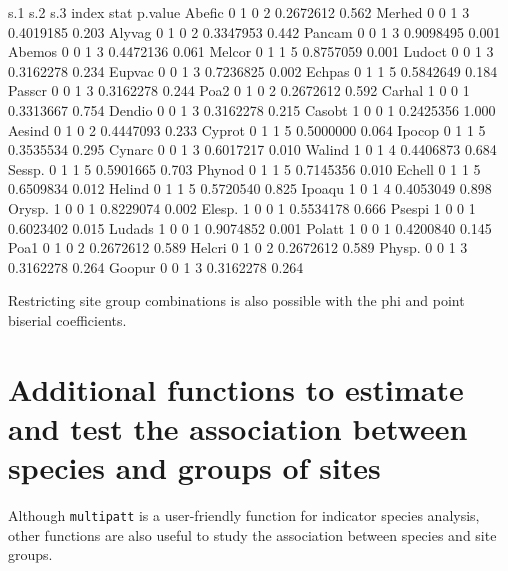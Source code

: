 \documentclass[11pt,a4paper]{article}
\begin{document}
\begin{Schunk}
\begin{Soutput}
       s.1 s.2 s.3 index      stat p.value
Abefic   0   1   0     2 0.2672612   0.562
Merhed   0   0   1     3 0.4019185   0.203
Alyvag   0   1   0     2 0.3347953   0.442
Pancam   0   0   1     3 0.9098495   0.001
Abemos   0   0   1     3 0.4472136   0.061
Melcor   0   1   1     5 0.8757059   0.001
Ludoct   0   0   1     3 0.3162278   0.234
Eupvac   0   0   1     3 0.7236825   0.002
Echpas   0   1   1     5 0.5842649   0.184
Passcr   0   0   1     3 0.3162278   0.244
Poa2     0   1   0     2 0.2672612   0.592
Carhal   1   0   0     1 0.3313667   0.754
Dendio   0   0   1     3 0.3162278   0.215
Casobt   1   0   0     1 0.2425356   1.000
Aesind   0   1   0     2 0.4447093   0.233
Cyprot   0   1   1     5 0.5000000   0.064
Ipocop   0   1   1     5 0.3535534   0.295
Cynarc   0   0   1     3 0.6017217   0.010
Walind   1   0   1     4 0.4406873   0.684
Sessp.   0   1   1     5 0.5901665   0.703
Phynod   0   1   1     5 0.7145356   0.010
Echell   0   1   1     5 0.6509834   0.012
Helind   0   1   1     5 0.5720540   0.825
Ipoaqu   1   0   1     4 0.4053049   0.898
Orysp.   1   0   0     1 0.8229074   0.002
Elesp.   1   0   0     1 0.5534178   0.666
Psespi   1   0   0     1 0.6023402   0.015
Ludads   1   0   0     1 0.9074852   0.001
Polatt   1   0   0     1 0.4200840   0.145
Poa1     0   1   0     2 0.2672612   0.589
Helcri   0   1   0     2 0.2672612   0.589
Physp.   0   0   1     3 0.3162278   0.264
Goopur   0   0   1     3 0.3162278   0.264
\end{Soutput}
\end{Schunk}
Restricting site group combinations is also possible with the phi and point biserial coefficients. 

\section{Additional functions to estimate and test the association between species and groups of sites}
Although \texttt{multipatt} is a user-friendly function for indicator species analysis, other functions are also useful to study the association between species and site groups. 
\end{document}
